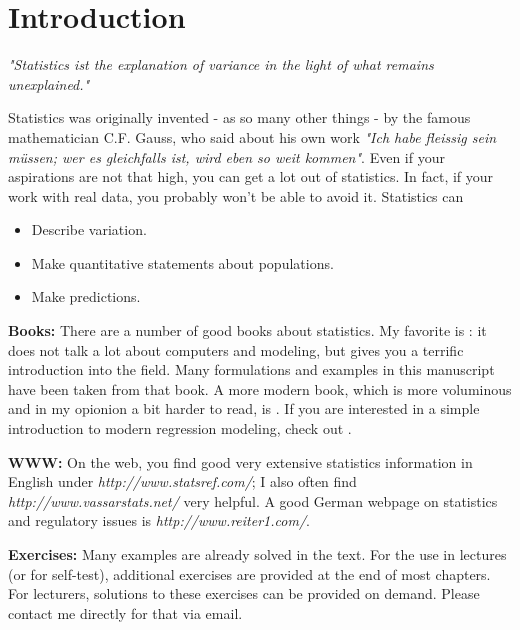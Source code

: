 \chapter{Introduction}

\emph{"Statistics ist the explanation of variance in the light of what remains
unexplained."}

\vspace{5 mm}

Statistics was originally invented - as so many other things - by the famous mathematician C.F. Gauss, who said about his own work \emph{"Ich habe fleissig sein m\"ussen; wer es gleichfalls ist, wird eben so weit kommen"}. Even if your aspirations are not that high, you can get a lot out of statistics. In fact, if your work with real data, you probably won't be able to avoid it. Statistics can

\begin{itemize}
  \item Describe variation.
  \item Make quantitative statements about populations.
  \item Make predictions.
\end{itemize}

\textbf{Books: }There are a number of good books about statistics. My favorite is \cite{altman99}: it does not talk a lot about computers and modeling, but gives you a terrific introduction into the field. Many formulations and examples in this manuscript have been taken from that book. A more modern book, which is more voluminous and in my opionion a bit harder to read, is \cite{Riffenburgh2012}. If you are interested in a simple introduction to modern regression modeling, check out \cite{Kaplan2009}.

\vspace{5 mm}

\textbf{WWW: }On the web, you find good very extensive statistics information in English under \emph{http://www.statsref.com/}; I also often find \emph{http://www.vassarstats.net/} very helpful. A good German webpage on statistics and regulatory issues is \emph{http://www.reiter1.com/}.

\vspace{5 mm}

\textbf{Exercises: }Many examples are already solved in the text. For the use in lectures (or for self-test), additional exercises are provided at the end of most chapters. For lecturers, solutions to these exercises can be provided on demand. Please contact me directly for that via email.

